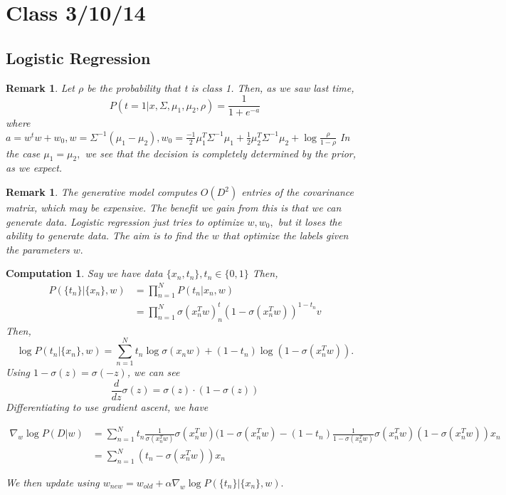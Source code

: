 \documentclass{amsart}
\newtheorem{comp}[subsubsection]{Computation}
\newtheorem{rem}[subsubsection]{Remark}
\begin{document}
\section{Class 3/10/14}

\subsection{Logistic Regression}
\begin{rem}
Let $\rho$ be the probability that t is class 1. Then, as we saw last time,
$$P(t=1|x,\Sigma,\mu_1,\mu_2,\rho) = \frac 1 {1+e^{-a}}$$
where $a = w^tw+w_0,w = \Sigma^{-1} (\mu_1 - \mu_2),w_0 = \frac {- 1} 2 \mu_1^T \Sigma^{-1}\mu_1 + \frac 1 2 \mu_2^T\Sigma^{-1}\mu_2 + \log {\frac {\rho} {1-\rho}}$
In the case $\mu_1 = \mu_2,$ we see that the decision is completely determined by the prior, as we expect.
\end{rem}
\begin{rem}
The generative model computes $O(D^2)$ entries of the covarinance matrix, which may be expensive. The benefit we gain from this is that we can generate data. Logistic regression just tries to optimize $w,w_0,$ but it loses the ability to generate data. The aim is to find the $w$ that optimize the labels given the parameters $w.$
\end{rem}

\begin{comp}
Say we have data $\{x_n,t_n\}, t_n \in \{0,1\}$ Then,
\begin{align*}
P(\{t_n\}|\{x_n\},w) &= \prod_{n=1}^N P(t_n|x_n,w)
\\
&= \prod_{n=1}^N \sigma(x_n^T w)^t_n (1-\sigma(x_n^Tw))^{1-t_n}
v\end{align*}
Then,
$$\log P(t_n|\{x_n\},w) = \sum_{n=1}^N t_n \log \sigma(x_nw) + (1-t_n) \log (1 - \sigma(x_n^Tw)).$$
Using $1-\sigma(z) = \sigma(-z)$, we can see
$$\frac d {dz} \sigma(z) = \sigma(z) \cdot (1-\sigma(z))$$
Differentiating to use gradient ascent, we have

\begin{align*}
  \nabla_w\log{P(D|w)} &= \sum_{n=1}^N t_n \frac 1 {\sigma (x_n^Tw)} \sigma(x_n^Tw)(1-\sigma(x_n^Tw) - (1-t_n) \frac 1 {1-\sigma(x_n^Tw)} \sigma(x_n^Tw)(1-\sigma(x_n^Tw))x_n
\\
&= \sum_{n=1}^N (t_n- \sigma(x_n^Tw))x_n
\end{align*}

We then update using $w_{new} = w_{old} +\alpha \nabla_w \log {P(\{t_n\}|\{x_n\},w)}.$
\end{comp}
\end{document}
